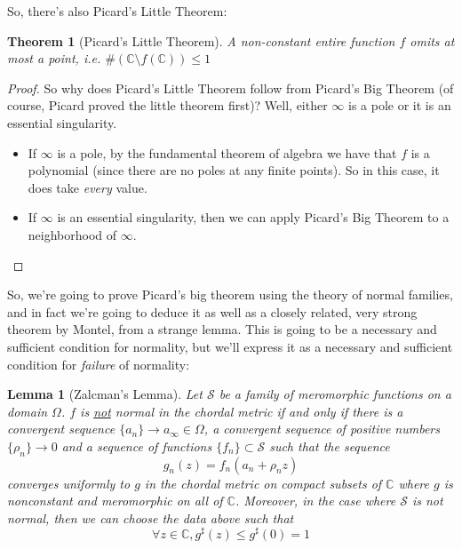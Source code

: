 \documentclass{article}
\newtheorem{theorem}{Theorem}
\newtheorem{lemma}{Lemma}
\newcommand{\mbb}[1]{\mathbb{#1}}
\newcommand{\mc}[1]{\mathcal{#1}}
\begin{document}
So, there's also Picard's Little Theorem:
\begin{theorem}[Picard's Little Theorem]
A non-constant entire function \(f\) omits at most a point, i.e. \(\#(\mbb{C}\setminus f(\mbb{C})) \leq 1\)
\end{theorem}
\begin{proof}
So why does Picard's Little Theorem follow from Picard's Big Theorem (of course, Picard proved the little theorem first)? Well, either \(\infty\) is a pole or it is an essential singularity.
\begin{itemize}

  \item If \(\infty\) is a pole, by the fundamental theorem of algebra we have that \(f\) is a polynomial (since there are no poles at any finite points). So in this case, it does take \textit{every} value.

  \item If \(\infty\) is an essential singularity, then we can apply Picard's Big Theorem to a neighborhood of \(\infty\).

\end{itemize}
\end{proof}
So, we're going to prove Picard's big theorem using the theory of normal families, and in fact we're going to deduce it as well as a closely related, very strong theorem by Montel, from a strange lemma. This is going to be a necessary and sufficient condition for normality, but we'll express it as a necessary and sufficient condition for \textit{failure} of normality:
\begin{lemma}[Zalcman's Lemma]
Let \(\mc{S}\) be a family of meromorphic functions on a domain \(\Omega\). \(f\) is \underline{not} normal in the chordal metric if and only if there is a convergent sequence \(\{a_n\} \to a_\infty \in \Omega\), a convergent sequence of positive numbers \(\{\rho_n\} \to 0\) and a sequence of functions \(\{f_n\} \subset \mc{S}\) such that the sequence
\begin{equation}g_n(z) = f_n(a_n + \rho_n z)\end{equation}
converges uniformly to \(g\) in the chordal metric on compact subsets of \(\mbb{C}\) where \(g\) is nonconstant and meromorphic on all of \(\mbb{C}\). Moreover, in the case where \(\mc{S}\) is not normal, then we can choose the data above such that
\begin{equation}\forall z \in \mbb{C}, g^\sharp(z) \leq g^\sharp(0) = 1\end{equation}
\end{lemma}
\end{document}
